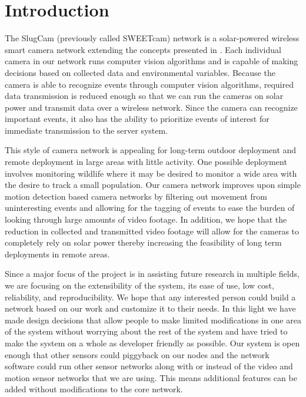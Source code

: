 

\section{Introduction}
 
The SlugCam (previously called SWEETcam) network is a solar-powered wireless
smart camera network extending the concepts presented in
\cite{sweetcam_article}. Each individual camera in our network runs computer
vision algorithms and is capable of making decisions based on collected data and
environmental variables. Because the camera is able to recognize events through
computer vision algorithms, required data transmission is reduced enough so that
we can run the cameras on solar power and transmit data over a wireless network.
Since the camera can recognize important events, it also has the ability to
prioritize events of interest for immediate transmission to the server system.

This style of camera network is appealing for long-term outdoor deployment and
remote deployment in large areas with little activity. One possible deployment
involves monitoring wildlife where it may be desired to monitor a wide area with
the desire to track a small population. Our camera network improves upon simple
motion detection based camera networks by filtering out movement from
uninteresting events and allowing for the tagging of events to ease the burden
of looking through large amounts of video footage. In addition, we hope that the
reduction in collected and transmitted video footage will allow for the cameras
to completely rely on solar power thereby increasing the feasibility of long
term deployments in remote areas.

Since a major focus of the project is in assisting future research in multiple
fields, we are focusing on the extensibility of the system, its ease of use, low
cost, reliability, and reproducibility. We hope that any interested person could
build a network based on our work and customize it to their needs. In this light
we have made design decisions that allow people to make limited modifications in
one area of the system without worrying about the rest of the system and have
tried to make the system on a whole as developer friendly as possible. Our
system is open enough that other sensors could piggyback on our nodes and the
network software could run other sensor networks along with or instead of the
video and motion sensor networks that we are using. This means additional
features can be added without modifications to the core network.

